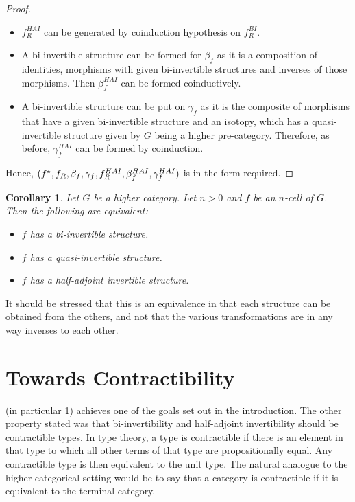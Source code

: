 \documentclass[draft]{article}
\newtheorem{cor}[theorem]{Corollary}
\begin{document}
\begin{proof}
\begin{itemize}
\begin{center}
    \end{center}
  \item \(f_R^{HAI}\) can be generated by coinduction hypothesis on
    \(f_R^{BI}\).
  \item A bi-invertible structure can be formed for \(\beta_f\) as it
    is a composition of identities, morphisms with given bi-invertible
    structures and inverses of those morphisms. Then \(\beta_f^{HAI}\)
    can be formed coinductively.
  \item A bi-invertible structure can be put on \(\gamma_f\) as it is
    the composite of morphisms that have a given bi-invertible
    structure and an isotopy, which has a quasi-invertible structure
    given by \(G\) being a higher pre-category. Therefore, as before,
    \(\gamma_f^{HAI}\) can be formed by coinduction.
  \end{itemize}
  Hence, \((f^\star, f_R, \beta_f, \gamma_f, f_R^{HAI},
  \beta_f^{HAI}, \gamma_f^{HAI})\) is in the form required.
\end{proof}

\begin{cor}\label{cor:equiv}
  Let \(G\) be a higher category. Let \(n > 0\) and \(f\) be an
  \(n\)-cell of \(G\). Then the following are equivalent:
  \begin{itemize}
  \item \(f\) has a bi-invertible structure.
  \item \(f\) has a quasi-invertible structure.
  \item \(f\) has a half-adjoint invertible structure.
  \end{itemize}
\end{cor}
It should be stressed that this is an equivalence in that each
structure can be obtained from the others, and not that the various
transformations are in any way inverses to each other.

\section{Towards Contractibility}\label{sec:contractibility}

 (in particular \cref{cor:equiv}) achieves one of the
goals set out in the introduction. The other property stated was that
bi-invertibility and half-adjoint invertibility should be contractible
types. In type theory, a type is contractible if there is an element
in that type to which all other terms of that type are propositionally
equal. Any contractible type is then equivalent to the unit type.
The natural analogue to the higher categorical setting would be to say
that a category is contractible if it is equivalent to the terminal
category.
\end{document}
